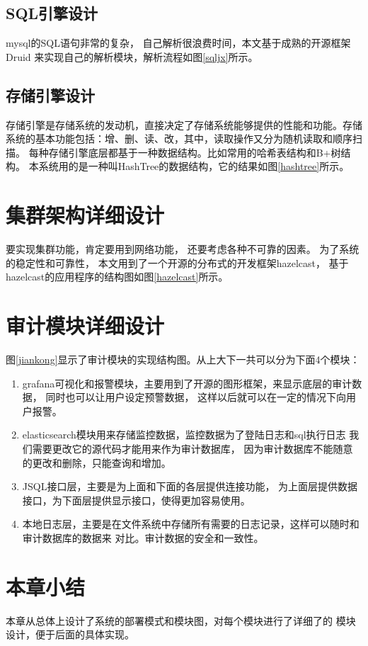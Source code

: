 \subsection{SQL引擎设计}
mysql的SQL语句非常的复杂，
自己解析很浪费时间，本文基于成熟的开源框架Druid
来实现自己的解析模块，解析流程如图\ref{sqljx}所示。
\subsection{存储引擎设计}
存储引擎是存储系统的发动机，直接决定了存储系统能够提供的性能和功能。存储
系统的基本功能包括：增、删、读、改，其中，读取操作又分为随机读取和顺序扫描。
每种存储引擎底层都基于一种数据结构。比如常用的哈希表结构和B+树结构。
本系统用的是一种叫HashTree的数据结构，它的结果如图\ref{hashtree}所示。
\section{集群架构详细设计}
要实现集群功能，肯定要用到网络功能，
还要考虑各种不可靠的因素。
为了系统的稳定性和可靠性，
本文用到了一个开源的分布式的开发框架hazelcast，
基于hazelcast的应用程序的结构图如图\ref{hazelcast}所示。
\section{审计模块详细设计}
图\ref{jiankong}显示了审计模块的实现结构图。从上大下一共可以分为下面4个模块：
\begin{enumerate}
	\item grafana可视化和报警模块，主要用到了开源的图形框架，来显示底层的审计数据，
	同时也可以让用户设定预警数据，
	这样以后就可以在一定的情况下向用户报警。
	\item elasticsearch模块用来存储监控数据，监控数据为了登陆日志和sql执行日志
	我们需要更改它的源代码才能用来作为审计数据库，
	因为审计数据库不能随意的更改和删除，只能查询和增加。
	\item JSQL接口层，主要是为上面和下面的各层提供连接功能，
	为上面层提供数据接口，为下面层提供显示接口，使得更加容易使用。
	\item 本地日志层，主要是在文件系统中存储所有需要的日志记录，这样可以随时和审计数据库的数据来
	对比。审计数据的安全和一致性。
\end{enumerate}
\section{本章小结}
本章从总体上设计了系统的部署模式和模块图，对每个模块进行了详细了的
模块设计，便于后面的具体实现。